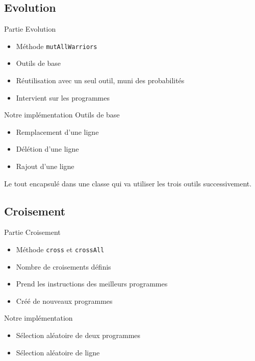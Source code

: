 \documentclass{beamer}
\begin{document}
\subsection{Evolution}
\begin{frame}%
\begin{center}
{\Large Partie Evolution}
\begin{itemize}
    \item Méthode \texttt{mutAllWarriors}
    \item Outils de base
    \item Réutilisation avec un seul outil, muni des probabilités
    \item Intervient sur les programmes
\end{itemize}
\begin{exampleblock}{Notre implémentation}
Outils de base
\begin{itemize}
    \item Remplacement d'une ligne
    \item Délétion d'une ligne
    \item Rajout d'une ligne
\end{itemize}
Le tout encapsulé dans une classe qui va utiliser les trois outils successivement.
\end{exampleblock}
\end{center}
\end{frame}

\subsection{Croisement}
\begin{frame}%
\begin{center}
{\Large Partie Croisement}
\end{center}
\begin{itemize}
    \item Méthode \texttt{cross} et \texttt{crossAll}
    \item Nombre de croisements définis
    \item Prend les instructions des meilleurs programmes
    \item Créé de nouveaux programmes
\end{itemize}
\begin{exampleblock}{Notre implémentation}
\begin{itemize}
    \item Sélection aléatoire de deux programmes
    \item Sélection aléatoire de ligne
\end{itemize}
\end{exampleblock}
\end{frame}
\end{document}
